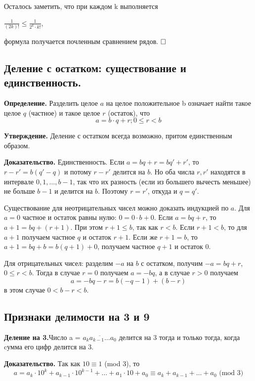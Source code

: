 \documentclass[a4paper, 10pt]{article}
\begin{document}
Осталось заметить, что при каждом k выполняется

\begin{center}
	$\displaystyle \frac{1}{(2k)!} \leqslant \frac{1}{2^k \cdot k!}$,
\end{center}

формула получается почленным сравнением рядов. $\hfill \square$

\subsection{Деление с остатком: существование и единственность.}

\textbf{Определение.} Разделить целое $a$ на целое положительное b означает найти такое целое $q$ (частное) и такое целое $r$ (остаток), что
$$a = b \cdot q + r; 0 \leqslant r < b$$

\textbf{Утверждение.} Деление с остатком всегда возможно, притом единственным
образом.

\textbf{Доказательство.} Единственность. Если $a = bq + r = bq' + r'$, то $r - r' = b(q' - q)$ и потому $r-r'$ делится на $b$. Но оба числа $r, r'$ находятся в интервале $0,1, \dots , b - 1$, так что их разность (если из большего вычесть меньшее) не больше $b - 1$ и делится на $b$. Поэтому $r = r'$, откуда и $q = q'$.

Существование для неотрицательных чисел можно доказать индукцией по $a$. Для $a = 0$ частное и остаток равны нулю: $0 = 0 \cdot b + 0$. Если $a = bq + r$, то $a + 1 = bq + (r + 1)$. При этом $r + 1 \leqslant b$, так как $r < b$. Если $r + 1 < b$, то для $a + 1$ получаем частное $q$ и остаток $r + 1$. Если же $r + 1 = b$, то $a + 1 = bq + b = b(q + 1) + 0$, получаем частное $q + 1$ и остаток 0.

Для отрицательных чисел: разделим $-a$ на $b$ с остатком, получим $-a = bq + r$, $0 \leqslant r < b$. Тогда в случае $r = 0$ получаем $a = -bq$, а в случае $r > 0$ получаем $$a = -bq - r = b(-q - 1) + (b - r)$$ в этом случае $0 < b - r < b$.

\subsection{Признаки делимости на 3 и 9}

\textbf{Деление на 3.}Число a = $\overline{a_ka_{k-1}\dots a_0}$ делится на 3 тогда и только тогда, когда cумма его цифр делится на 3.

\textbf{Доказательство.} Так как $10 \equiv 1$ (mod 3), то $$a = a_k \cdot 10^k + a_{k - 1} \cdot 10^{k - 1} + \dots + a_1 \cdot 10 + a_0 \equiv a_k + a_{k - 1} + \dots + a_0 \text{ (mod 3)}$$
\end{document}
